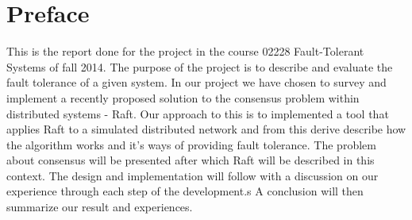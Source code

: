 \thispagestyle{empty}

\section*{Preface} %
\label{sec:preface}

This is the report done for the project in the course 02228 Fault-Tolerant Systems of fall 2014. The purpose of the project is to describe and evaluate the fault tolerance of a given system. In our project we have chosen to survey and implement a recently proposed solution to the consensus problem within distributed systems - Raft.
Our approach to this is to implemented a tool that applies Raft to a simulated distributed network and from this derive describe how the algorithm works and it's ways of providing fault tolerance. The problem about consensus will be presented after which Raft will be described in this context. The design and implementation will follow with a discussion on our experience through each step of the development.s
A conclusion will then summarize our result and experiences.

